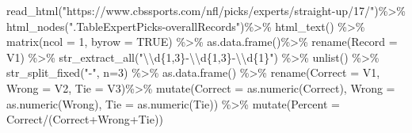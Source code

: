 \documentclass[
]{article}
\newenvironment{Shaded}{\begin{snugshade}}{\end{snugshade}}
\newcommand{\AttributeTok}[1]{\textcolor[rgb]{0.77,0.63,0.00}{#1}}
\newcommand{\ConstantTok}[1]{\textcolor[rgb]{0.00,0.00,0.00}{#1}}
\newcommand{\DecValTok}[1]{\textcolor[rgb]{0.00,0.00,0.81}{#1}}
\newcommand{\FunctionTok}[1]{\textcolor[rgb]{0.00,0.00,0.00}{#1}}
\newcommand{\NormalTok}[1]{#1}
\newcommand{\OtherTok}[1]{\textcolor[rgb]{0.56,0.35,0.01}{#1}}
\newcommand{\SpecialCharTok}[1]{\textcolor[rgb]{0.00,0.00,0.00}{#1}}
\newcommand{\StringTok}[1]{\textcolor[rgb]{0.31,0.60,0.02}{#1}}
\begin{document}
\begin{Shaded}
\begin{Highlighting}[]
\FunctionTok{read\_html}\NormalTok{(}\StringTok{"https://www.cbssports.com/nfl/picks/experts/straight{-}up/17/"}\NormalTok{)}\SpecialCharTok{\%\textgreater{}\%}
    \FunctionTok{html\_nodes}\NormalTok{(}\StringTok{".TableExpertPicks{-}overallRecords"}\NormalTok{)}\SpecialCharTok{\%\textgreater{}\%}
    \FunctionTok{html\_text}\NormalTok{() }\SpecialCharTok{\%\textgreater{}\%} 
    \FunctionTok{matrix}\NormalTok{(}\AttributeTok{ncol =} \DecValTok{1}\NormalTok{, }\AttributeTok{byrow =} \ConstantTok{TRUE}\NormalTok{) }\SpecialCharTok{\%\textgreater{}\%}
    \FunctionTok{as.data.frame}\NormalTok{()}\SpecialCharTok{\%\textgreater{}\%}
    \FunctionTok{rename}\NormalTok{(}\StringTok{\textasciigrave{}}\AttributeTok{Record}\StringTok{\textasciigrave{}} \OtherTok{=}\NormalTok{ V1) }\SpecialCharTok{\%\textgreater{}\%} 
    \FunctionTok{str\_extract\_all}\NormalTok{(}\StringTok{"}\SpecialCharTok{\textbackslash{}\textbackslash{}}\StringTok{d\{1,3\}{-}}\SpecialCharTok{\textbackslash{}\textbackslash{}}\StringTok{d\{1,3\}{-}}\SpecialCharTok{\textbackslash{}\textbackslash{}}\StringTok{d\{1\}"}\NormalTok{) }\SpecialCharTok{\%\textgreater{}\%} 
    \FunctionTok{unlist}\NormalTok{() }\SpecialCharTok{\%\textgreater{}\%} 
    \FunctionTok{str\_split\_fixed}\NormalTok{(}\StringTok{"{-}"}\NormalTok{, }\AttributeTok{n=}\DecValTok{3}\NormalTok{) }\SpecialCharTok{\%\textgreater{}\%} 
    \FunctionTok{as.data.frame}\NormalTok{() }\SpecialCharTok{\%\textgreater{}\%} 
    \FunctionTok{rename}\NormalTok{(}\StringTok{\textasciigrave{}}\AttributeTok{Correct}\StringTok{\textasciigrave{}} \OtherTok{=}\NormalTok{ V1, }\StringTok{\textasciigrave{}}\AttributeTok{Wrong}\StringTok{\textasciigrave{}} \OtherTok{=}\NormalTok{ V2, }\StringTok{\textasciigrave{}}\AttributeTok{Tie}\StringTok{\textasciigrave{}} \OtherTok{=}\NormalTok{ V3)}\SpecialCharTok{\%\textgreater{}\%} 
    \FunctionTok{mutate}\NormalTok{(}\AttributeTok{Correct =} \FunctionTok{as.numeric}\NormalTok{(Correct), }\AttributeTok{Wrong =} \FunctionTok{as.numeric}\NormalTok{(Wrong), }\AttributeTok{Tie =} \FunctionTok{as.numeric}\NormalTok{(Tie)) }\SpecialCharTok{\%\textgreater{}\%} 
    \FunctionTok{mutate}\NormalTok{(}\AttributeTok{Percent =}\NormalTok{ Correct}\SpecialCharTok{/}\NormalTok{(Correct}\SpecialCharTok{+}\NormalTok{Wrong}\SpecialCharTok{+}\NormalTok{Tie))}
\end{Highlighting}
\end{Shaded}
\end{document}
